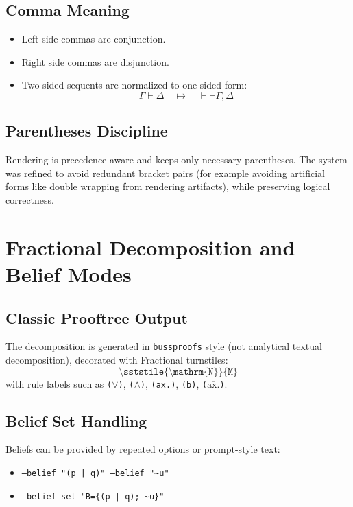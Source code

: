 \documentclass[11pt,a4paper]{article}
\begin{document}
\subsection{Comma Meaning}
\begin{itemize}[leftmargin=1.5em]
  \item Left side commas are conjunction.
  \item Right side commas are disjunction.
  \item Two-sided sequents are normalized to one-sided form:
  \[
    \Gamma \vdash \Delta \quad \mapsto \quad \vdash \neg\Gamma,\Delta
  \]
\end{itemize}

\subsection{Parentheses Discipline}
Rendering is precedence-aware and keeps only necessary parentheses. The system was refined to avoid redundant bracket pairs (for example avoiding artificial forms like double wrapping from rendering artifacts), while preserving logical correctness.

\section{Fractional Decomposition and Belief Modes}
\subsection{Classic Prooftree Output}
The decomposition is generated in \texttt{bussproofs} style (not analytical textual decomposition), decorated with Fractional turnstiles:
\[
\texttt{\textbackslash sststile\{\textbackslash mathrm\{N\}\}\{M\}}
\]
with rule labels such as \texttt{($\vee$)}, \texttt{($\wedge$)}, \texttt{(ax.)}, \texttt{(b)}, \texttt{($\overline{\text{ax.}}$)}.

\subsection{Belief Set Handling}
Beliefs can be provided by repeated options or prompt-style text:
\begin{itemize}[leftmargin=1.5em]
  \item \texttt{--belief "(p | q)" --belief "\textasciitilde u"}
  \item \texttt{--belief-set "B=\{(p | q); \textasciitilde u\}"}
\end{itemize}
\end{document}
